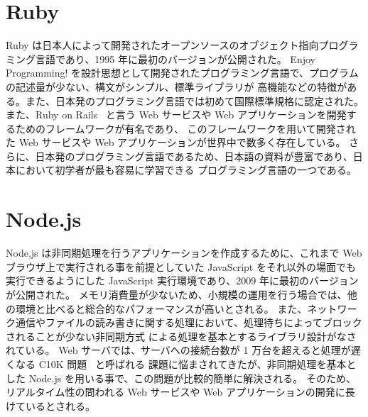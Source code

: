 \section{Ruby}
\label{cha:script-language:ruby}

Ruby は日本人によって開発されたオープンソースのオブジェクト指向プログラミング言語であり、1995 年に最初のバージョンが公開された。
Enjoy Programming! を設計思想として開発されたプログラミング言語で、プログラムの記述量が少ない、構文がシンプル、標準ライブラリが
高機能などの特徴がある。また、日本発のプログラミング言語では初めて国際標準規格に認定された。
また、Ruby on Rails~\cite{Rails} と言う Web サービスや Web アプリケーションを開発するためのフレームワークが有名であり、
このフレームワークを用いて開発された Web サービスや Web アプリケーションが世界中で数多く存在している。
さらに、日本発のプログラミング言語であるため、日本語の資料が豊富であり、日本において初学者が最も容易に学習できる
プログラミング言語の一つである。

\section{Node.js}
\label{cha:script-language:nodejs}

Node.js は非同期処理を行うアプリケーションを作成するために、これまで Web ブラウザ上で実行される事を前提としていた
JavaScript をそれ以外の場面でも実行できるようにした JavaScript 実行環境であり、2009 年に最初のバージョンが公開された。
メモリ消費量が少ないため、小規模の運用を行う場合では、他の環境と比べると総合的なパフォーマンスが高いとされる。
また、ネットワーク通信やファイルの読み書きに関する処理において、処理待ちによってブロックされることが少ない非同期方式
による処理を基本とするライブラリ設計がなされている。
Web サーバでは、サーバへの接続台数が 1 万台を超えると処理が遅くなる C10K 問題~\cite{C10k} と呼ばれる
課題に悩まされてきたが、非同期処理を基本とした Node.js を用いる事で、この問題が比較的簡単に解決される。
そのため、リアルタイム性の問われる Web サービスや Web アプリケーションの開発に長けているとされる。

